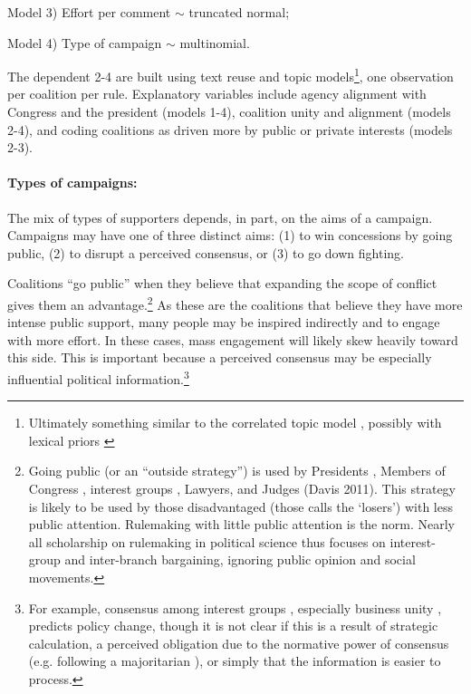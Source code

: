 Model 3) Effort per comment $\sim$ truncated normal; 

Model 4) Type of campaign $\sim$ multinomial. 

The dependent 2-4 are built using text reuse and topic models\footnote{
Ultimately something similar to the correlated topic model \citep{Blei2005}, possibly with lexical priors \citep{Fong2016}
},
one observation per coalition per rule. Explanatory variables include agency alignment with Congress and the president (models 1-4), coalition unity and alignment (models 2-4), and coding coalitions as driven more by public or private interests (models 2-3).%

\paragraph{Types of campaigns:} The mix of types of supporters depends, in part, on the aims of a campaign. Campaigns may have one of three distinct aims: (1) to win concessions by going public, (2) to disrupt a perceived consensus, or (3) to go down fighting. 

Coalitions ``go public'' when they believe that expanding the scope of conflict gives them an advantage.\footnote{
Going public (or an ``outside strategy'') is used by Presidents \citep{Kernell2007}, Members of Congress \citep{Malecha2012}, interest groups \citep{Walker1991, Dur2013}, Lawyers, and Judges (Davis 2011). 
This strategy is likely to be used by those disadvantaged (those \citet{Schattschneider1975} calls the `losers') with less public attention.
Rulemaking with little public attention is the norm. Nearly all scholarship on rulemaking in political science thus focuses on interest-group and inter-branch bargaining, ignoring public opinion and social movements. 
}
As these are the coalitions that believe they have more intense public support, many people may be inspired indirectly and to engage with more effort. In these cases, mass engagement will likely skew heavily toward this side. This is important because a perceived consensus may be especially influential political information.\footnote{
For example, consensus among interest groups \citep{Golden1998, Yackee2006JPART}, especially business unity \citep{Yackee2006JOP, Haeder2015}, predicts policy change, though it is not clear if this is a result of strategic calculation, a perceived obligation due to the normative power of consensus (e.g. following a majoritarian \citep{Mendelson2011}), or simply that the information is easier to process.
}

